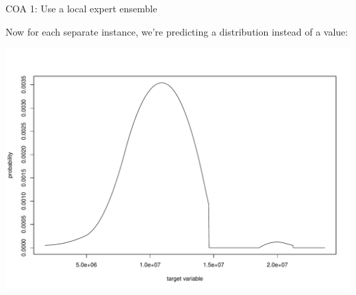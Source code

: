 \documentclass[ignorenonframetext,]{beamer}
\newenvironment{Shaded}{\begin{snugshade}}{\end{snugshade}}
\newcommand{\KeywordTok}[1]{\textcolor[rgb]{0.13,0.29,0.53}{\textbf{{#1}}}}
\newcommand{\DataTypeTok}[1]{\textcolor[rgb]{0.13,0.29,0.53}{{#1}}}
\newcommand{\DecValTok}[1]{\textcolor[rgb]{0.00,0.00,0.81}{{#1}}}
\newcommand{\OtherTok}[1]{\textcolor[rgb]{0.56,0.35,0.01}{{#1}}}
\newcommand{\NormalTok}[1]{{#1}}
\begin{document}
\begin{frame}[fragile]{COA 1: Use a local expert ensemble}

Now for each separate instance, we're predicting a distribution instead
of a value:

\footnotesize

\begin{Shaded}
\end{Shaded}

\includegraphics{presentation_files/figure-beamer/unnamed-chunk-14-1.pdf}


\end{frame}
\end{document}
